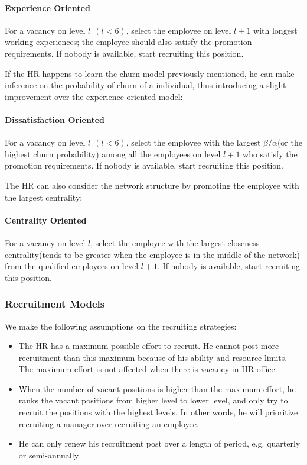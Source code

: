 \documentclass[tcn = 37075, sheet = false, abstract = false]{mcmthesis}
\begin{document}
\paragraph{Experience Oriented} For a vacancy on level $l ~~ (l < 6)$, select the employee on level $l+1$ with longest working experiences; the employee should also satisfy the promotion requirements. If nobody is available, start recruiting this position.

If the HR happens to learn the churn model previously mentioned, he can make inference on the probability of churn of a individual, thus introducing a slight improvement over the experience oriented model:
\paragraph{Dissatisfaction Oriented} For a vacancy on level $l ~~ (l < 6)$, select the employee with the largest $\beta / \alpha$(or the highest churn probability) among all the employees on level $l+1$ who satisfy the promotion requirements. If nobody is available, start recruiting this position.

The HR can also consider the network structure by promoting the employee with the largest centrality:

\paragraph{Centrality Oriented} For a vacancy on level $l$, select the employee with the largest closeness centrality(tends to be greater when the employee is in the middle of the network) from the qualified employees on level $l+1$. If nobody is available, start recruiting this position.


\subsubsection{Recruitment Models}
We make the following assumptions on the recruiting strategies:
\begin{itemize}
\item The HR has a maximum possible effort to recruit. He cannot post more recruitment than this maximum because of his ability and resource limits. The maximum effort is not affected when there is vacancy in HR office. 
\item When the number of vacant positions is higher than the maximum effort, he ranks the vacant positions from higher level to lower level, and only try to recruit the positions with the highest levels. In other words, he will prioritize recruiting a manager over recruiting an employee. 
\item He can only renew his recruitment post over a length of period, e.g. quarterly or semi-annually.
\end{itemize}
\end{document}
